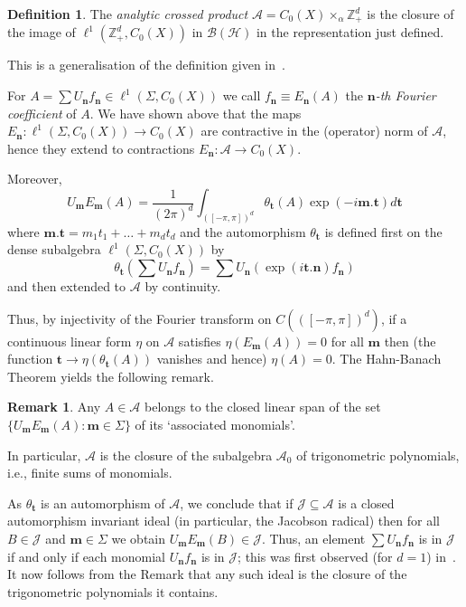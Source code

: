 \documentclass[12pt]{amsart}
\theoremstyle{definition}
\newtheorem{definition}[theorem]{Definition}
\newtheorem*{remark}{Remark}
\newcommand{\mcA}{\mathcal{A}}
\newcommand{\mcJ}{\mathcal{J}}
\newcommand{\bbZ}{\mathbb{Z}}
\newcommand{\BH}{\mathcal{B}(\mathcal{H})}
\newcommand{\bo}[1]{\mathbf{#1}}
\newcommand{\bom}{\mathbf{m}}
\newcommand{\bon}{\mathbf{n}}
\newcommand{\gS}{{\Sigma}}
\begin{document}
\begin{definition}
The \emph{analytic crossed product}
$\mcA = C_0(X)\times_\alpha\bbZ_+^d$ is the closure of the image of
$\ell^1(\bbZ_+^d,C_0(X))$ in $\BH$ in the representation
just defined.
\end{definition}

This is a generalisation of the definition given in~\cite{Pet88a}.

\medskip

For $A=\sum U_{\bon}f_{\bon} \in\ell^1(\gS,C_0(X))$ we call
$f_{\bon}\equiv E_{\bon}(A)$ the \emph{${\bon}$-th Fourier
coefficient }of $A$. We have shown above that the maps
$E_{\bon}:\ell^1(\gS,C_0(X))\rightarrow C_0(X)$ are contractive
in the (operator) norm of $\mcA$, hence they extend to
contractions $E_{\bon}:\mcA\to C_0(X)$.

Moreover,
\[
U_{\bom} E_{\bom}(A) =
\frac{1}{(2 \pi)^d} \int_{([- \pi ,
\pi])^d}\theta_{\bo{t}}(A) \exp (-i\bo{m.t})d\bo{t}
\]
where $\bo{m.t} = m_1t_1+ \ldots + m_dt_d$ and the automorphism
$\theta_{\bo{t}}$ is defined first on the dense subalgebra
$\ell^1(\gS,C_0(X))$ by
\[
\theta_{\bo{t}} \left(\sum U_{\bon}f_{\bon} \right)
    = \sum U_{\bon} (\exp (i \bo{t.n}) f_{\bon})
\]
and then extended to $\mcA$ by continuity.

Thus, by injectivity of the Fourier transform on $C(([-\pi,\pi])^d)$,
if a continuous linear form $\eta$ on $\mcA$ satisfies
$\eta (E_{\bom}(A))=0$ for all $\bom$ then (the function
$\bo{t} \to \eta( \theta_{\bo{t}}(A))$ vanishes and hence)
$\eta(A)=0$.
The Hahn-Banach Theorem yields the following remark.

\begin{remark}\label{fej}
Any $A \in \mcA$ belongs to the closed linear span of the set
$\{U_{\bom} E_{\bom}(A) : \bom \in \gS \}$ of its
`associated monomials'.

In particular, $\mcA$ is the closure of the subalgebra $\mcA_0$ of
trigonometric polynomials, i.e., finite sums of monomials.
\end{remark}

As $\theta_{\bo{t}}$ is an automorphism of $\mcA$, we conclude
that if $\mcJ\subseteq \mcA$ is a closed automorphism invariant
ideal (in particular, the Jacobson radical) then for all $B\in\mcJ$
and $\bom\in\gS$ we obtain $U_{\bom}E_{\bom}(B) \in\mcJ$.
Thus, an element $\sum U_{\bon}f_{\bon} $ is in $\mcJ$ if and only
if each monomial $U_{\bon}f_{\bon} $ is in $\mcJ$;
this was first observed (for $d=1$) in~\cite[Proposition~2.1]{Muh83}.
It now follows from the Remark that any such ideal is the closure
of the trigonometric polynomials it contains.
\end{document}
